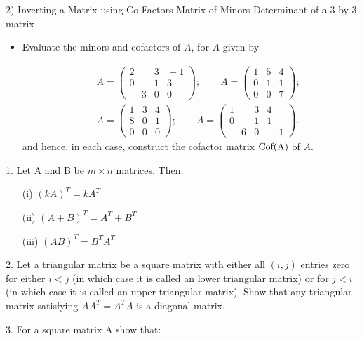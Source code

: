 \documentclass[12pt,a4paper]{article}
\begin{document}
2) Inverting a Matrix using Co-Factors
	Matrix of Minors
	Determinant of a 3 by 3 matrix

\begin{itemize}	
\item Evaluate the  minors and cofactors of $A$, for $A$ given by

\begin{eqnarray*}
& &\!\!\!\!\!\!\!\!A=\left( \begin{array}{ccc}
2 & 3 & \!\!\!\!-1\\
0 & 1 & 3\\
\!\!\!\!-3 & 0 & 0\end{array}\right);\qquad A=\left( \begin{array}{ccc}
1 & 5 & 4\\
0 & 1 & 1\\
0 & 0 & 7
\end{array} \right);\\
& &\!\!\!\!\!\!\!\!A=\left( \begin{array}{ccc}
1 & 3 & 4\\
8 & 0 & 1\\
0 & 0 & 0\end{array}\right);\qquad A=\left( \begin{array}{ccc}
1 & 3 & 4\\
0 & 1 & 1\\
\!\!\!\!-6 & 0 & \!\!\!\!-1
\end{array} \right).
\end{eqnarray*}
and hence, in each case, construct the cofactor matrix $\textnormal{Cof(A)}$ of $A$.
\end{itemize}

1. Let A and B be $m \times n$ matrices. Then:

\begin{itemize}
\item[(i)] $(kA)^T = kA^T$
\item[(ii)] $(A+B)^T = A^T + B^T$
\item[(iii)] $(AB)^T = B^TA^T$
\end{itemize}

2. Let a triangular matrix be a square matrix with either all $(i,j)$ entries zero for either $i<j$ 
(in which case it is called an lower triangular matrix) or for $j<i$ (in which case it is called an upper triangular matrix). 
Show that any triangular matrix satisfying $AA^T = A^TA$ is a diagonal matrix.

3. For a square matrix A show that:
\end{document}
